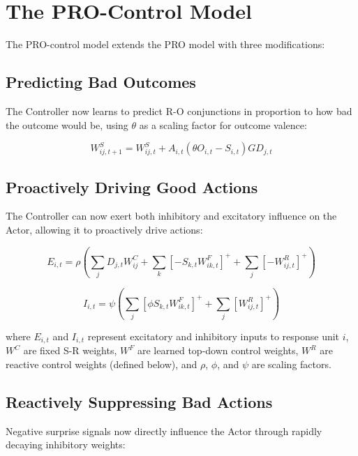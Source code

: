 \section{The PRO-Control Model}

The PRO-control model extends the PRO model with three modifications:

\subsection{Predicting Bad Outcomes}

The Controller now learns to predict R-O conjunctions in proportion to how bad the outcome would be, using $\theta$ as a scaling factor for outcome valence:

\begin{equation}
W^S_{ij,t+1} = W^S_{ij,t} + A_{i,t} (\theta O_{i,t} - S_{i,t})G D_{j,t}
\end{equation}


\subsection{Proactively Driving Good Actions}

The Controller can now exert both inhibitory and excitatory influence on the Actor, allowing it to proactively drive actions:

\begin{equation}
E_{i,t} = \rho \left( \sum_j D_{j,t} W^C_{ij} + \sum_k [-S_{k,t}W^F_{ik,t}]^+ + \sum_j [-W^R_{ij,t}]^+ \right)
\end{equation}

\begin{equation}
I_{i,t} = \psi \left( \sum_j [\phi S_{k,t} W^F_{ik,t}]^+ + \sum_j [W^R_{ij,t}]^+ \right)
\end{equation}

where $E_{i,t}$ and $I_{i,t}$ represent excitatory and inhibitory inputs to response unit $i$, $W^C$ are fixed S-R weights, $W^F$ are learned top-down control weights, $W^R$ are reactive control weights (defined below), and $\rho$, $\phi$, and $\psi$ are scaling factors.

\subsection{Reactively Suppressing Bad Actions}

Negative surprise signals now directly influence the Actor through rapidly decaying inhibitory weights:


